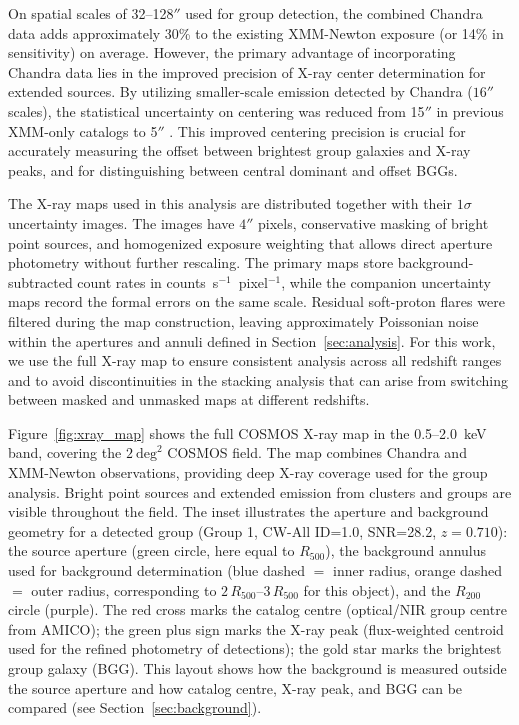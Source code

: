 \documentclass{aa}
\begin{document}
On spatial scales of 32--128$''$ used for group detection, the combined Chandra data adds approximately 30\% to the existing XMM-Newton exposure (or 14\% in sensitivity) on average. However, the primary advantage of incorporating Chandra data lies in the improved precision of X-ray center determination for extended sources. By utilizing smaller-scale emission detected by Chandra ($16''$ scales), the statistical uncertainty on centering was reduced from 15$''$ in previous XMM-only catalogs to 5$''$ \citep{Gozaliasl2019}. This improved centering precision is crucial for accurately measuring the offset between brightest group galaxies and X-ray peaks, and for distinguishing between central dominant and offset BGGs.

The X-ray maps used in this analysis are distributed together with their $1\sigma$ uncertainty images. The images have $4''$ pixels, conservative masking of bright point sources, and homogenized exposure weighting that allows direct aperture photometry without further rescaling. The primary maps store background-subtracted count rates in counts~s$^{-1}$~pixel$^{-1}$, while the companion uncertainty maps record the formal errors on the same scale. Residual soft-proton flares were filtered during the map construction, leaving approximately Poissonian noise within the apertures and annuli defined in Section~\ref{sec:analysis}. For this work, we use the full X-ray map to ensure consistent analysis across all redshift ranges and to avoid discontinuities in the stacking analysis that can arise from switching between masked and unmasked maps at different redshifts.

Figure~\ref{fig:xray_map} shows the full COSMOS X-ray map in the 0.5--2.0~keV band, covering the $2~\mathrm{deg}^2$ COSMOS field. The map combines Chandra and XMM-Newton observations, providing deep X-ray coverage used for the group analysis. Bright point sources and extended emission from clusters and groups are visible throughout the field. The inset illustrates the aperture and background geometry for a detected group (Group 1, CW-All ID=1.0, SNR=28.2, $z = 0.710$): the source aperture (green circle, here equal to $R_{500}$), the background annulus used for background determination (blue dashed $=$ inner radius, orange dashed $=$ outer radius, corresponding to $2\,R_{500}$--$3\,R_{500}$ for this object), and the $R_{200}$ circle (purple). The red cross marks the catalog centre (optical/NIR group centre from AMICO); the green plus sign marks the X-ray peak (flux-weighted centroid used for the refined photometry of detections); the gold star marks the brightest group galaxy (BGG). This layout shows how the background is measured outside the source aperture and how catalog centre, X-ray peak, and BGG can be compared (see Section~\ref{sec:background}).
\end{document}
